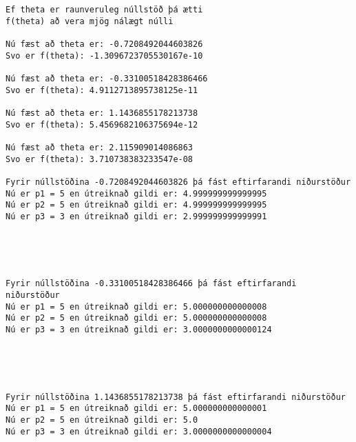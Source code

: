\documentclass[11pt]{article}
\begin{document}
    \begin{Verbatim}[commandchars=\\\{\}]
Ef theta er raunveruleg núllstöð þá ætti
f(theta) að vera mjög nálægt núlli 

Nú fæst að theta er: -0.7208492044603826
Svo er f(theta): -1.3096723705530167e-10 

Nú fæst að theta er: -0.33100518428386466
Svo er f(theta): 4.9112713895738125e-11 

Nú fæst að theta er: 1.1436855178213738
Svo er f(theta): 5.4569682106375694e-12 

Nú fæst að theta er: 2.115909014086863
Svo er f(theta): 3.710738383233547e-08 

Fyrir núllstöðina -0.7208492044603826 þá fást eftirfarandi niðurstöður
Nú er p1 = 5 en útreiknað gildi er: 4.999999999999995
Nú er p2 = 5 en útreiknað gildi er: 4.999999999999995
Nú er p3 = 3 en útreiknað gildi er: 2.999999999999991



    \end{Verbatim}

    \begin{center}
    \end{center}
    { \hspace*{\fill} \\}
    
    \begin{Verbatim}[commandchars=\\\{\}]
Fyrir núllstöðina -0.33100518428386466 þá fást eftirfarandi niðurstöður
Nú er p1 = 5 en útreiknað gildi er: 5.000000000000008
Nú er p2 = 5 en útreiknað gildi er: 5.000000000000008
Nú er p3 = 3 en útreiknað gildi er: 3.0000000000000124



    \end{Verbatim}

    \begin{center}
    \end{center}
    { \hspace*{\fill} \\}
    
    \begin{Verbatim}[commandchars=\\\{\}]
Fyrir núllstöðina 1.1436855178213738 þá fást eftirfarandi niðurstöður
Nú er p1 = 5 en útreiknað gildi er: 5.000000000000001
Nú er p2 = 5 en útreiknað gildi er: 5.0
Nú er p3 = 3 en útreiknað gildi er: 3.0000000000000004



    \end{Verbatim}
\end{document}
